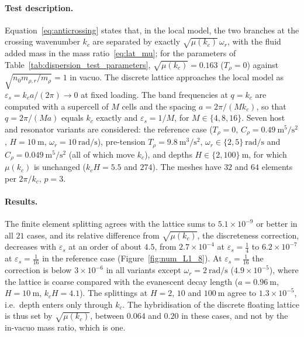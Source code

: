 {\paragraph{Test description.} Equation~\eqref{eq:anticrossing} states that, in the local model, the two branches at the crossing wavenumber $k_c$ are separated by exactly $\sqrt{\mu(k_c)}\,\omega_r$, with the fluid added mass in the mass ratio~\eqref{eq:lat_mu}; for the parameters of Table~\ref{tab:dispersion_test_parameters}, $\sqrt{\mu(k_c)}=0.163$ ($T_\rho=0$) against $\sqrt{n_0m_{\rho,r}/m_\rho}=1$ in vacuo. The discrete lattice approaches the local model as $\varepsilon_s=k_ca/(2\pi)\to0$ at fixed loading. The band frequencies at $q=k_c$ are computed with a supercell of $M$ cells and the spacing $a=2\pi/(Mk_c)$, so that $q=2\pi/(Ma)$ equals $k_c$ exactly and $\varepsilon_s=1/M$, for $M\in\{4,8,16\}$. Seven host and resonator variants are considered: the reference case ($T_\rho=0$, $C_\rho=0.49~\si{\meter\tothe{5}\per\second\squared}$, $H=10~\si{\meter}$, $\omega_r=10~\si{\radian\per\second}$), pre-tension $T_\rho=9.8~\si{\meter\cubed\per\second\squared}$, $\omega_r\in\{2,5\}~\si{\radian\per\second}$ and $C_\rho=0.049~\si{\meter\tothe{5}\per\second\squared}$ (all of which move $k_c$), and depths $H\in\{2,100\}~\si{\meter}$, for which $\mu(k_c)$ is unchanged ($k_cH=5.5$ and $274$). The meshes have $32$ and $64$ elements per $2\pi/k_c$, $p=3$.

\paragraph{Results.} The finite element splitting agrees with the lattice sums to $5.1\times10^{-9}$ or better in all $21$ cases, and its relative difference from $\sqrt{\mu(k_c)}$, the discreteness correction, decreases with $\varepsilon_s$ at an order of about $4.5$, from $2.7\times10^{-4}$ at $\varepsilon_s=\tfrac14$ to $6.2\times10^{-7}$ at $\varepsilon_s=\tfrac1{16}$ in the reference case (Figure~\ref{fig:num_L1_8}). At $\varepsilon_s=\tfrac1{16}$ the correction is below $3\times10^{-6}$ in all variants except $\omega_r=2~\si{\radian\per\second}$ ($4.9\times10^{-5}$), where the lattice is coarse compared with the evanescent decay length ($a=0.96~\si{\meter}$, $H=10~\si{\meter}$, $k_cH=4.1$). The splittings at $H=2$, $10$ and $100~\si{\meter}$ agree to $1.3\times10^{-5}$, i.e.\ depth enters only through $k_c$. The hybridisation of the discrete floating lattice is thus set by $\sqrt{\mu(k_c)}$, between $0.064$ and $0.20$ in these cases, and not by the in-vacuo mass ratio, which is one.

}
